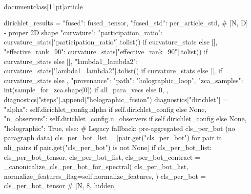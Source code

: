 \\documentclass[11pt]{article}
\begin{document}
\begin{CodeBlock}
                    dirichlet_results = {
                        "fused": fused_tensor,
                        "fused_std": per_article_std,  # [N, D] - proper 2D shape
                        "curvature": {
                            "participation_ratio": curvature_stats["participation_ratio"].tolist() if curvature_stats else [],
                            "effective_rank_90": curvature_stats["effective_rank_90"].tolist() if curvature_stats else [],
                            "lambda1_lambda2": curvature_stats["lambda1_lambda2"].tolist() if curvature_stats else [],
                        } if curvature_stats else {},
                        "provenance": {
                            "path": "holographic_loop",
                            "zca_samples": int(sample_for_zca.shape[0]) if all_para_vecs else 0,
                        },
                    }
                    diagnostics["steps"].append("holographic_fusion")
                    diagnostics["dirichlet"] = {
                        "alpha": self.dirichlet_config.alpha if self.dirichlet_config else None,
                        "n_observers": self.dirichlet_config.n_observers if self.dirichlet_config else None,
                        "holographic": True,
                    }
            else:
                # Legacy fallback: pre-aggregated cls_per_bot (no paragraph data)
                cls_per_bot_list = [pair.get("cls_per_bot") for pair in nli_pairs if pair.get("cls_per_bot") is not None]
                if cls_per_bot_list:
                    cls_per_bot_tensor, cls_per_bot_list, cls_per_bot_contract = _canonicalize_cls_per_bot_for_spectral(
                        cls_per_bot_list,
                        normalize_features_flag=self.normalize_features,
                    )
                    cls_per_bot = cls_per_bot_tensor  # [N, 8, hidden]


\end{CodeBlock}
\end{document}
